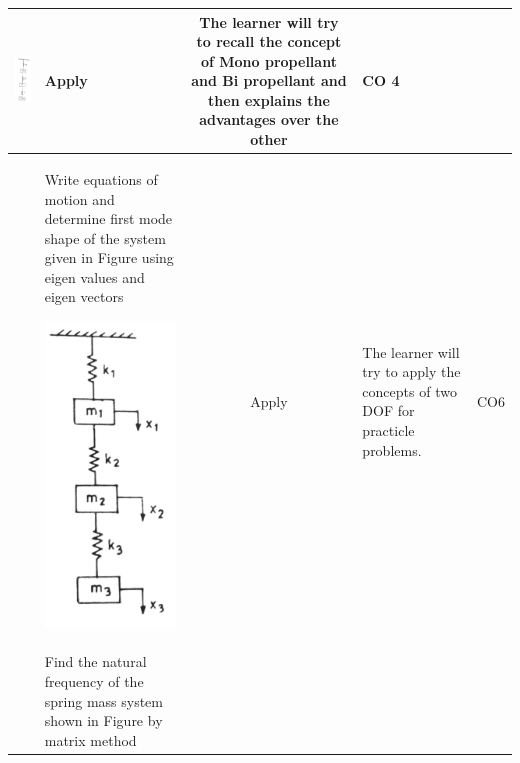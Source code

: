 \documentclass[11pt,paper=a4,answers]{exam}
\begin{document}
\begin{flushleft}
\begin{longtable}{|>{\centering\arraybackslash}p{0.8cm}  | >{\raggedright\arraybackslash}p{6.5cm}  | c | >{\raggedright\arraybackslash}p{5cm} |>{\centering\arraybackslash}p{1cm}|}
\includegraphics[scale=0.4]{6_15.png}&	Apply&	The learner will try to \textbf{recall} the concept of Mono propellant and Bi propellant and then \textbf{explain}s the advantages over the other&	CO 4\\
	\hline
	7& 
Write equations of motion and determine first mode shape  of the system  given in Figure using eigen values and eigen vectors

\includegraphics[scale=0.3]{6_16.png}
	&	Apply&	The learner will try to apply the concepts of two DOF for practicle problems. &	CO6\\
		\hline 
8&	
Find the natural frequency of the spring mass system shown in Figure by matrix method


\end{longtable}
\end{flushleft}
\end{document}
